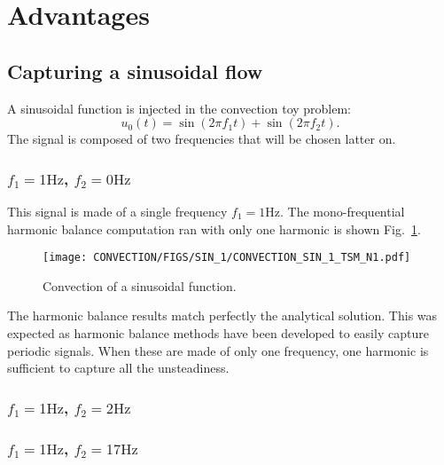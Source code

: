 \section{Advantages} %
\label{sec:advantages}

\subsection{Capturing a sinusoidal flow} %
\label{sub:capturing_a_sinusoidal_flow}

A sinusoidal function is injected in the convection toy problem:
\begin{equation}
	u_0(t) = \sin (2 \pi f_1 t) + \sin(2 \pi f_2 t).
\end{equation}
The signal is composed of two frequencies that will 
be chosen latter on.

\subsubsection{$f_1 = 1 \text{Hz}$, $f_2 = 0 \text{Hz}$}

This signal is made of a single frequency $f_1 = 1 \text{Hz}$.
The mono-frequential harmonic balance computation ran with only one harmonic
is shown Fig.~\ref{fig:convection_sin_1_tsm_n_1}.
\begin{figure}[htbp]
  \begin{center}
    \texttt{[image: CONVECTION/FIGS/SIN\_1/CONVECTION\_SIN\_1\_TSM\_N1.pdf]}
  \end{center}
  \caption{Convection of a sinusoidal function.}
  \label{fig:convection_sin_1_tsm_n_1}
\end{figure}
The harmonic balance results match perfectly the analytical solution.
This was expected as harmonic balance methods have been developed to
easily capture periodic signals. When these are made of only one frequency,
one harmonic is sufficient to capture all the unsteadiness.

\subsubsection{$f_1 = 1 \text{Hz}$, $f_2 = 2 \text{Hz}$}



\subsubsection{$f_1 = 1 \text{Hz}$, $f_2 = 17 \text{Hz}$}


